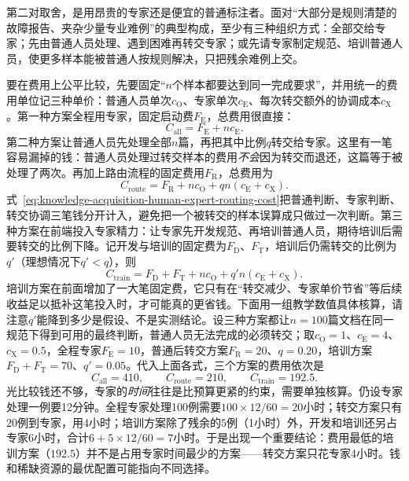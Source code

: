 第二对取舍，是用昂贵的专家还是便宜的普通标注者。面对“大部分是规则清楚的故障报告、夹杂少量专业难例”的典型构成，至少有三种组织方式：全部交给专家；先由普通人员处理、遇到困难再转交专家；或先请专家制定规范、培训普通人员，使更多样本能被普通人按规则解决，只把残余难例上交。

要在费用上公平比较，先要固定“$n$个样本都要达到同一完成要求”，并用统一的费用单位记三种单价：普通人员单次$c_{\mathrm{O}}$、专家单次$c_{\mathrm{E}}$、每次转交额外的协调成本$c_{\mathrm{X}}$。第一种方案全程用专家，固定启动费$F_{\mathrm{E}}$，总费用很直接：
\[
  C_{\mathrm{all}}=F_{\mathrm{E}}+nc_{\mathrm{E}}.
\]
第二种方案让普通人员先处理全部$n$篇，再把其中比例$q$转交给专家。这里有一笔容易漏掉的钱：普通人员处理过转交样本的费用\emph{不会}因为转交而退还，这篇等于被处理了两次。再加上路由流程的固定费用$F_{\mathrm{R}}$，总费用为
\begin{equation}
  C_{\mathrm{route}}
  =F_{\mathrm{R}}+nc_{\mathrm{O}}
   +qn(c_{\mathrm{E}}+c_{\mathrm{X}}).
  \label{eq:knowledge-acquisition-human-expert-routing-cost}
\end{equation}
式~\eqref{eq:knowledge-acquisition-human-expert-routing-cost}把普通判断、专家判断、转交协调三笔钱分开计入，避免把一个被转交的样本误算成只做过一次判断。第三种方案在前端投入专家精力：让专家先开发规范、再培训普通人员，期待培训后需要转交的比例下降。记开发与培训的固定费为$F_{\mathrm{D}}$、$F_{\mathrm{T}}$，培训后仍需转交的比例为$q'$（理想情况下$q'<q$），则
\begin{equation}
  C_{\mathrm{train}}
  =F_{\mathrm{D}}+F_{\mathrm{T}}+nc_{\mathrm{O}}
   +q'n(c_{\mathrm{E}}+c_{\mathrm{X}}).
  \label{eq:knowledge-acquisition-human-expert-training-cost}
\end{equation}
培训方案在前面增加了一大笔固定费，它只有在“转交减少、专家单价节省”等后续收益足以抵补这笔投入时，才可能真的更省钱。下面用一组教学数值具体核算，请注意$q'$能降到多少是假设、不是实测结论。设三种方案都让$n=100$篇文档在同一规范下得到可用的最终判断，普通人员无法完成的必须转交；取$c_{\mathrm{O}}=1$、$c_{\mathrm{E}}=4$、$c_{\mathrm{X}}=0.5$，全程专家$F_{\mathrm{E}}=10$，普通后转交方案$F_{\mathrm{R}}=20$、$q=0.20$，培训方案$F_{\mathrm{D}}+F_{\mathrm{T}}=70$、$q'=0.05$。代入上面各式，三个方案的费用依次是
\[
  C_{\mathrm{all}}=410,\qquad
  C_{\mathrm{route}}=210,\qquad
  C_{\mathrm{train}}=192.5.
\]
光比较钱还不够，专家的\emph{时间}往往是比预算更紧的约束，需要单独核算。仍设专家处理一例要12分钟。全程专家处理100例需要$100\times12/60=20$小时；转交方案只有$20$例到专家，用4小时；培训方案除了残余的$5$例（1小时）外，开发和培训还另占专家6小时，合计$6+5\times12/60=7$小时。于是出现一个重要结论：费用最低的培训方案（$192.5$）并不是占用专家时间最少的方案——转交方案只花专家4小时。钱和稀缺资源的最优配置可能指向不同选择。

